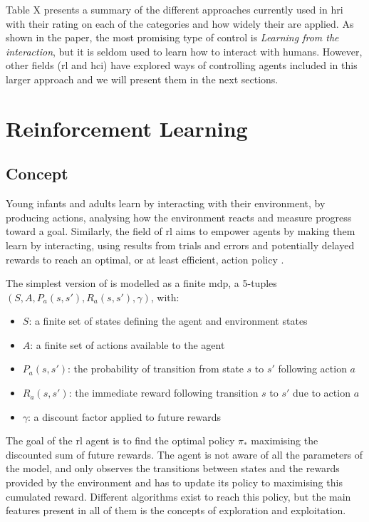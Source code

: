 	Table X presents a summary of the different approaches currently used in \gls{hri} with their rating on each of the categories and how widely their are applied. As shown in the paper, the most promising type of control is \textit{Learning from the interaction}, but it is seldom used to learn how to interact with humans. However, other fields (\acrlong{rl} and \gls{hci}) have explored ways of controlling agents included in this larger approach and we will present them in the next sections.

\section{Reinforcement Learning} 	
\subsection{Concept}
	Young infants and adults learn by interacting with their environment, by producing actions, analysing how the environment reacts and measure progress toward a goal. Similarly, the field of \acrfull{rl} aims to empower agents by making them learn by interacting, using results from trials and errors and potentially delayed rewards to reach an optimal, or at least efficient, action policy \cite{sutton1998reinforcement}.

	The simplest version of  is modelled as a finite \acrfull{mdp}, a 5-tuples $(S, A, P_a(s,s'), R_a(s,s'), \gamma)$, with:
	\begin{itemize}
		\item $S$: a finite set of states defining the agent and environment states
		\item $A$: a finite set of actions available to the agent
		\item $P_a(s,s')$: the probability of transition from state $s$ to $s'$ following action $a$
		\item $R_a(s,s')$: the immediate reward following transition $s$ to $s'$ due to action $a$
		\item $\gamma$: a discount factor applied to future rewards
	\end{itemize}

	The goal of the \gls{rl} agent is to find the optimal policy $\pi_*$ maximising the discounted sum of future rewards. The agent is not aware of all the parameters of the model, and only observes the transitions between states and the rewards provided by the environment and has to update its policy to maximising this cumulated reward. Different algorithms exist to reach this policy, but the main features present in all of them is the concepts of exploration and exploitation.
	
